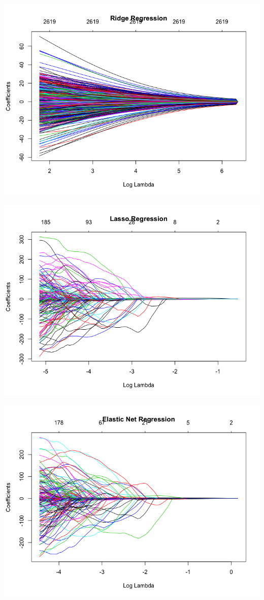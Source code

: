 \documentclass[11pt,letterpaper]{article}
\begin{document}
\includegraphics[scale=0.5]{3-a-1.png}

\includegraphics[scale=0.5]{3-a-2.png}

\includegraphics[scale=0.5]{3-a-3.png}
\end{document}

